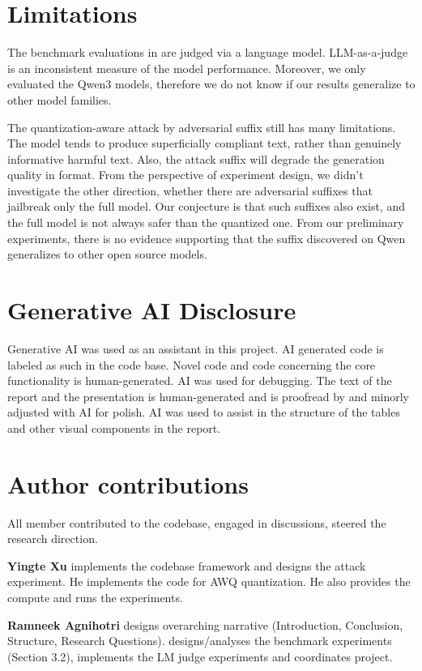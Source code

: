 \documentclass{article}
\begin{document}
\section{Limitations}
The benchmark evaluations in  are judged via a language model. LLM-as-a-judge is an inconsistent measure of the model performance.
Moreover, we only evaluated the Qwen3 models, therefore we do not know if our results generalize to other model families.      

The quantization-aware attack by adversarial suffix still has many limitations. The model tends to produce superficially compliant text, rather than genuinely informative harmful text. Also, the attack suffix will degrade the generation quality in format. 
From the perspective of experiment design, we didn't investigate the other direction, whether there are adversarial suffixes that jailbreak only the full model. Our conjecture is that such suffixes also exist, and the full model is not always safer than the quantized one.
From our preliminary experiments, there is no evidence supporting that the suffix discovered on Qwen generalizes to other open source models.


\section{Generative AI Disclosure}

Generative AI was used as an assistant in this project. AI generated code is labeled as such in the code base. Novel code and code concerning the core functionality is human-generated. AI was used for debugging. 
The text of the report and the presentation is human-generated and is proofread by and minorly adjusted with AI for polish. 
AI was used to assist in the structure of the tables and other visual components in the report.

\section{Author contributions}
All member contributed to the codebase, engaged in discussions, steered the research direction. 

\textbf{Yingte Xu} implements the codebase framework and designs the attack experiment. He implements the code for AWQ quantization.
He also provides the compute and runs the experiments.

\textbf{Ramneek Agnihotri} designs overarching narrative (Introduction, Conclusion, Structure, Research Questions). designs/analyses the benchmark experiments (Section 3.2), 
implements the LM judge experiments and coordinates project.
\end{document}
